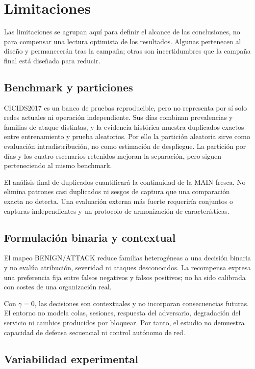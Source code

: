 \chapter{Limitaciones}

Las limitaciones se agrupan aquí para definir el alcance de las conclusiones, no para compensar una lectura optimista de los resultados. Algunas pertenecen al diseño y permanecerán tras la campaña; otras son incertidumbres que la campaña final está diseñada para reducir.

\section{Benchmark y particiones}

CICIDS2017 es un banco de pruebas reproducible, pero no representa por sí solo redes actuales ni operación independiente. Sus días combinan prevalencias y familias de ataque distintas, y la evidencia histórica muestra duplicados exactos entre entrenamiento y prueba aleatorios. Por ello la partición aleatoria sirve como evaluación intradistribución, no como estimación de despliegue. La partición por días y los cuatro escenarios retenidos mejoran la separación, pero siguen perteneciendo al mismo benchmark.

El análisis final de duplicados cuantificará la continuidad de la MAIN fresca. No elimina patrones casi duplicados ni sesgos de captura que una comparación exacta no detecta. Una evaluación externa más fuerte requeriría conjuntos o capturas independientes y un protocolo de armonización de características.

\section{Formulación binaria y contextual}

El mapeo BENIGN/ATTACK reduce familias heterogéneas a una decisión binaria y no evalúa atribución, severidad ni ataques desconocidos. La recompensa expresa una preferencia fija entre falsos negativos y falsos positivos; no ha sido calibrada con costes de una organización real.

Con $\gamma=0$, las decisiones son contextuales y no incorporan consecuencias futuras. El entorno no modela colas, sesiones, respuesta del adversario, degradación del servicio ni cambios producidos por bloquear. Por tanto, el estudio no demuestra capacidad de defensa secuencial ni control autónomo de red.

\section{Variabilidad experimental}

